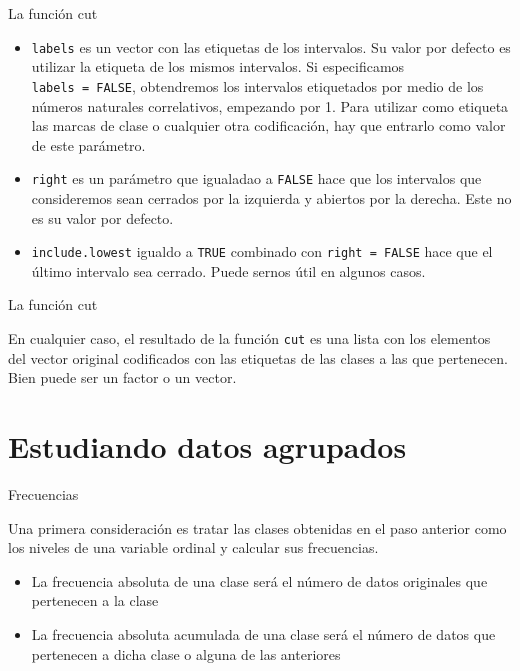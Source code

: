 \documentclass[
  ignorenonframetext,
]{beamer}
\providecommand{\tightlist}{%
  \setlength{\itemsep}{0pt}\setlength{\parskip}{0pt}}
\begin{document}
\begin{frame}[fragile]{La función cut}
\protect\hypertarget{la-funciuxf3n-cut-1}{}

\begin{itemize}
\tightlist
\item
  \texttt{labels} es un vector con las etiquetas de los intervalos. Su
  valor por defecto es utilizar la etiqueta de los mismos intervalos. Si
  especificamos \texttt{labels\ =\ FALSE}, obtendremos los intervalos
  etiquetados por medio de los números naturales correlativos, empezando
  por 1. Para utilizar como etiqueta las marcas de clase o cualquier
  otra codificación, hay que entrarlo como valor de este parámetro.
\item
  \texttt{right} es un parámetro que igualadao a \texttt{FALSE} hace que
  los intervalos que consideremos sean cerrados por la izquierda y
  abiertos por la derecha. Este no es su valor por defecto.
\item
  \texttt{include.lowest} igualdo a \texttt{TRUE} combinado con
  \texttt{right\ =\ FALSE} hace que el último intervalo sea cerrado.
  Puede sernos útil en algunos casos.
\end{itemize}

\end{frame}

\begin{frame}[fragile]{La función cut}
\protect\hypertarget{la-funciuxf3n-cut-2}{}

En cualquier caso, el resultado de la función \texttt{cut} es una lista
con los elementos del vector original codificados con las etiquetas de
las clases a las que pertenecen. Bien puede ser un factor o un vector.

\end{frame}

\hypertarget{estudiando-datos-agrupados}{%
\section{Estudiando datos agrupados}\label{estudiando-datos-agrupados}}

\begin{frame}{Frecuencias}
\protect\hypertarget{frecuencias}{}

Una primera consideración es tratar las clases obtenidas en el paso
anterior como los niveles de una variable ordinal y calcular sus
frecuencias.

\begin{itemize}
\tightlist
\item
  La frecuencia absoluta de una clase será el número de datos originales
  que pertenecen a la clase
\item
  La frecuencia absoluta acumulada de una clase será el número de datos
  que pertenecen a dicha clase o alguna de las anteriores
\end{itemize}

\end{frame}
\end{document}
